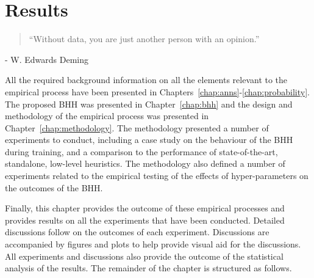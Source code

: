 \chapter{Results}
\label{chap:results}

\begin{quotation}
      \noindent ``Without data, you are just another person with an opinion.''
\end{quotation}
\begin{flushright}
      - W. Edwards Deming
\end{flushright}

\noindent
All the required background information on all the elements relevant to the empirical process have been presented in Chapters~\ref{chap:anns}-\ref{chap:probability}. The proposed \acf{BHH} was presented in Chapter~\ref{chap:bhh} and the design and methodology of the empirical process was presented in Chapter~\ref{chap:methodology}. The methodology presented a number of experiments to conduct, including a case study on the behaviour of the \acs{BHH} during training, and a comparison to the performance of state-of-the-art, standalone, low-level heuristics. The methodology also defined a number of experiments related to the empirical testing of the effects of hyper-parameters on the outcomes of the \acs{BHH}.

Finally, this chapter provides the outcome of these empirical processes and provides results on all the experiments that have been conducted. Detailed discussions follow on the outcomes of each experiment. Discussions are accompanied by figures and plots to help provide visual aid for the discussions. All experiments and discussions also provide the outcome of the statistical analysis of the results. The remainder of the chapter is structured as follows.

